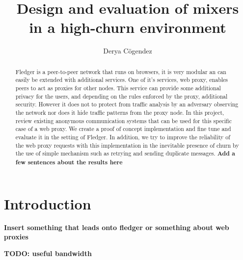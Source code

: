 \documentclass[a4paper,11pt,oneside]{report}
\title{Design and evaluation of mixers\\in a high-churn environment}
\author{Derya Cögendez}
\begin{document}
\maketitle
\makeacks

\begin{abstract}
Fledger is a peer-to-peer network that runs on browsers, it is very modular an can easily be extended with additional services. One of it's services, web proxy, enables peers to act as proxies for other nodes. This service can provide some additional privacy for the users, and depending on the rules enforced by the proxy, additional security. However it does not to protect from traffic analysis by an adversary observing the network nor does it hide traffic patterns from the proxy node. In this project, review existing anonymous communication systems that can be used for this specific case of a web proxy. We create a proof of concept implementation and fine tune and evaluate it in the setting of Fledger. In addition, we try to improve the reliability of the web proxy requests with this implementation in the inevitable presence of churn by the use of simple mechanism such as retrying and sending duplicate messages.
\textbf{Add a few sentences about the results here}
\end{abstract}

\maketoc

\chapter{Introduction}

\textbf{Insert something that leads onto fledger or something about web proxies}

\textbf{TODO: useful bandwidth}
\end{document}
